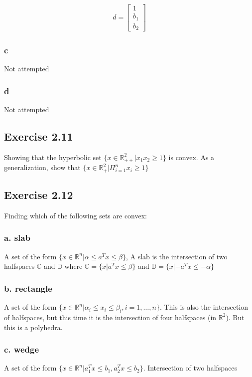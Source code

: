 \begin{align}
  d = 
  \begin{bmatrix}
    1 \\ 
    b_1 \\
    b_2    
  \end{bmatrix}
\end{align}

\subsubsection{c}
Not attempted
\subsubsection{d}
Not attempted

\subsection{Exercise 2.11}
Showing that the hyperbolic set $\{x \in \mathbb{R}^2_{++} | x_1 x_2 \geq 1\}$ is convex. As a generalization, show that $\{x \in \mathbb{R}^2_{+} | \Pi_{i=1}^n x_i \geq 1\}$
\subsection{Exercise 2.12}
Finding which of the following sets are convex:
\subsubsection{a. slab}
A set of the form $\{x \in \mathbb{R}^n | \alpha \leq a^T x \leq \beta\}$,
A slab is the intersection of two halfspaces $\mathbb{C}$ and $\mathbb{D}$ 
where $\mathbb{C} = \{x| a^T x \leq \beta\}$ and $\mathbb{D} = \{x| -a^T x \leq -\alpha\}$  

\subsubsection{b. rectangle}
A set of the form $\{ x \in \mathbb{R}^n | \alpha_i \leq x_i \leq \beta_i, i = 1,\dots, n\}$.
This is also the intersection of halfspaces, but this time it is the intersection of four halfspaces (in $\mathbb{R}^2$). But this is a polyhedra.

\subsubsection{c. wedge}
A set of the form $\{x \in \mathbb{R}^n | a_1^T x \leq b_1, a_2^T x \leq b_2\}$.
Intersection of two halfspaces 

